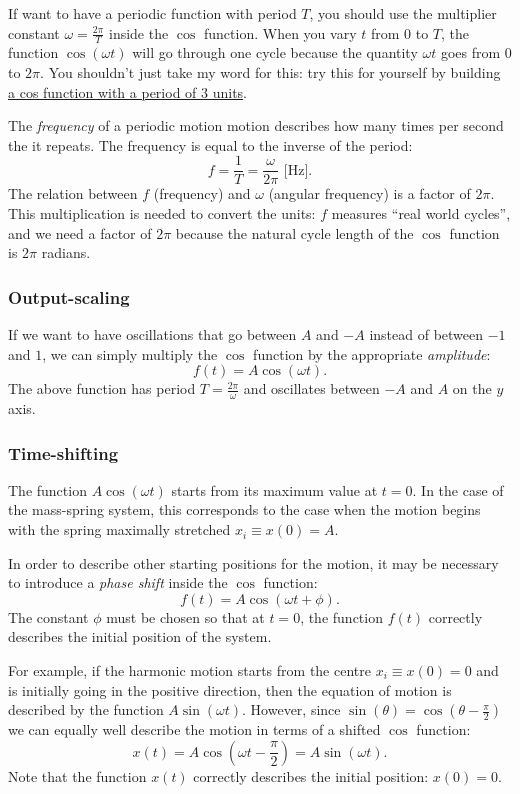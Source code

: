 \documentclass[letterpaper,9pt,journal]{IEEEtran}
\newcommand{\dokuitalic}[1]{\textsl{#1}}
\begin{document}
If want to have a periodic function with period $T$,
you should use the multiplier constant $\omega = \frac{2\pi}{T}$ inside the $\cos$ function.
When you vary $t$ from $0$ to $T$, the function $\cos(\omega t )$
will go through one cycle because the quantity $\omega t$ goes from $0$ to $2\pi$.
You shouldn't just take my word for this: 
try this for yourself by building \href{http://www.wolframalpha.com/input/?i=plot(cos(2*pi/3*t))}{a cos function with a period of 3 units}.

The \dokuitalic{frequency} of a periodic motion motion describes how many times per second the it repeats. 
The frequency is equal to the inverse of the period:
\[
 f=\frac{1}{T}=\frac{\omega}{2\pi} \text{ [Hz].}
\]
The relation between $f$ (frequency) and $\omega$ (angular frequency) is a factor of $2\pi$.
This  multiplication is  needed to convert the units:  $f$ measures ``real world cycles'',
and we need a factor of $2\pi$ because the natural cycle length of the $\cos$ function is $2\pi$ radians.


\subsubsection{Output-scaling}

If we want to have oscillations that go between $A$ and $-A$ instead
of between $-1$ and $1$, we can simply multiply the $\cos$ function by the appropriate \dokuitalic{amplitude}:
\[
 f(t)=A\cos(\omega t).
\]
The above function has period $T=\frac{2\pi}{\omega}$ and 
oscillates between $-A$ and $A$ on the $y$ axis.


\subsubsection{Time-shifting}

The function $A\cos(\omega t)$ starts from its maximum value at $t=0$.
In the case of the mass-spring system, this corresponds to the case 
when the motion begins with the spring maximally stretched $x_i\equiv x(0)=A$. 

In order to describe other starting positions for the motion, 
it may be necessary to introduce a \dokuitalic{phase shift} inside the $\cos$ function:
\[
 f(t)=A\cos(\omega t   + \phi).
\]
The constant $\phi$ must be chosen so that at $t=0$, the function $f(t)$ correctly 
describes the initial position of the system.

For example, if the harmonic motion starts from the centre $x_i \equiv x(0)=0$
and is initially going in the positive direction, then the equation of motion is
described by the function $A\sin(\omega t)$.
However, since $\sin(\theta)=\cos(\theta - \frac{\pi}{2})$ we can equally
well describe the motion in terms of a shifted $\cos$ function:
\[
 x(t) = A\cos\!\left(\omega t - \frac{\pi}{2}\right) = A\sin(\omega t).
\]
Note that the function $x(t)$ correctly describes the initial position: $x(0)=0$.
\end{document}
